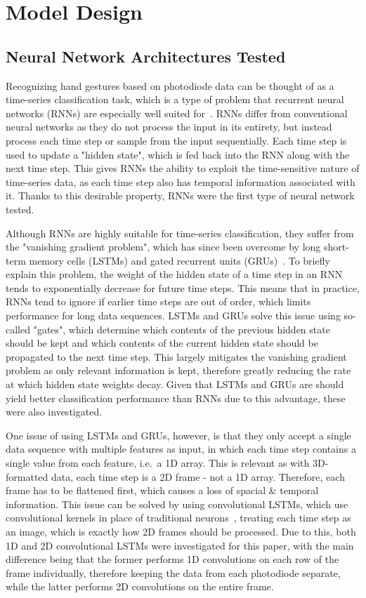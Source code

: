 \section{Model Design}\label{sec:model-design}
\subsection{Neural Network Architectures Tested}\label{subsec:architectures-tested}
Recognizing hand gestures based on photodiode data can be thought of as a time-series classification task, which is a type of problem that recurrent neural networks (RNNs) are especially well suited for~\cite{HUSKEN2003223}.
RNNs differ from conventional neural networks as they do not process the input in its entirety, but instead process each time step or sample from the input sequentially.
Each time step is used to update a "hidden state", which is fed back into the RNN along with the next time step.
This gives RNNs the ability to exploit the time-sensitive nature of time-series data, as each time step also has temporal information associated with it.
Thanks to this desirable property, RNNs were the first type of neural network tested.

Although RNNs are highly suitable for time-series classification, they suffer from the "vanishing gradient problem", which has since been overcome by long short-term memory cells (LSTMs) and gated recurrent units (GRUs)~\cite{DBLP:journals/corr/abs-1801-06105}.
To briefly explain this problem, the weight of the hidden state of a time step in an RNN tends to exponentially decrease for future time steps.
This means that in practice, RNNs tend to ignore if earlier time steps are out of order, which limits performance for long data sequences.
LSTMs and GRUs solve this issue using so-called "gates", which determine which contents of the previous hidden state should be kept and which contents of the current hidden state should be propagated to the next time step.
This largely mitigates the vanishing gradient problem as only relevant information is kept, therefore greatly reducing the rate at which hidden state weights decay.
Given that LSTMs and GRUs are should yield better classification performance than RNNs due to this advantage, these were also investigated.

One issue of using LSTMs and GRUs, however, is that they only accept a single data sequence with multiple features as input, in which each time step contains a single value from each feature, i.e.\ a 1D array.
This is relevant as with 3D-formatted data, each time step is a 2D frame - not a 1D array.
Therefore, each frame has to be flattened first, which causes a loss of spacial \& temporal information.
This issue can be solved by using convolutional LSTMs, which use convolutional kernels in place of traditional neurons~\cite{https://doi.org/10.48550/arxiv.1506.04214}, treating each time step as an image, which is exactly how 2D frames should be processed.
Due to this, both 1D and 2D convolutional LSTMs were investigated for this paper, with the main difference being that the former performs 1D convolutions on each row of the frame individually, therefore keeping the data from each photodiode separate, while the latter performs 2D convolutions on the entire frame.

